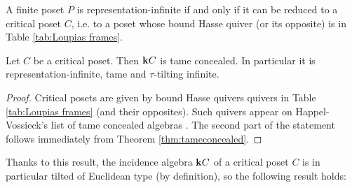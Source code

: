 \begin{theorem} \label{thm:Lou75concealed}
	A finite poset $P$ is representation-infinite if and only if it can be reduced to a critical poset $C$, i.e. to a poset whose bound Hasse quiver (or its opposite) is in Table \ref{tab:Loupias frames}. 
\end{theorem}


\begin{lemma}\label{lemma:postameconc}
	Let $C$ be a critical poset. Then $\mathbf{k}{C}$ is tame concealed.
	In particular it is representation-infinite, tame and $\tau$-tilting infinite.
\end{lemma}
\begin{proof}
	Critical posets are given by bound Hasse quivers quivers in Table \ref{tab:Loupias frames} (and their opposites). Such quivers appear on Happel-Vossieck’s list of tame concealed algebras \cite{hap:min}. The second part of the statement follows immediately from Theorem \ref{thm:tameconcealed}.
\end{proof}

Thanks to this result, the incidence algebra $\mathbf{k}{C}$ of a critical poset $C$ is in particular tilted of Euclidean type (by definition), so the following result holds:

